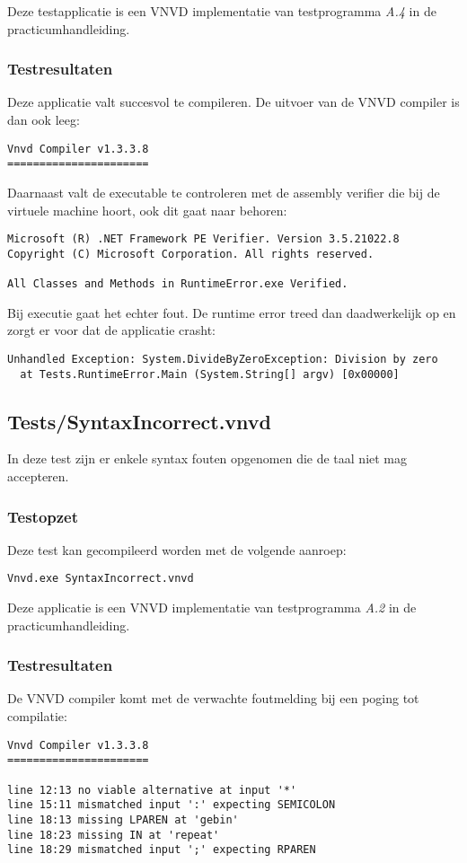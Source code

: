 Deze testapplicatie is een VNVD implementatie van testprogramma \textit{A.4} in de practicumhandleiding.

\subsubsection{Testresultaten}
Deze applicatie valt succesvol te compileren. De uitvoer van de VNVD compiler is dan ook leeg:

\begin{lstlisting}
Vnvd Compiler v1.3.3.8
======================

\end{lstlisting}

Daarnaast valt de executable te controleren met de assembly verifier die bij de virtuele machine hoort, ook dit gaat naar behoren:

\begin{lstlisting}
Microsoft (R) .NET Framework PE Verifier. Version 3.5.21022.8
Copyright (C) Microsoft Corporation. All rights reserved.

All Classes and Methods in RuntimeError.exe Verified.
\end{lstlisting}

Bij executie gaat het echter fout. De runtime error treed dan daadwerkelijk op en zorgt er voor dat de applicatie crasht:

\begin{lstlisting}
Unhandled Exception: System.DivideByZeroException: Division by zero
  at Tests.RuntimeError.Main (System.String[] argv) [0x00000]
\end{lstlisting}

\subsection{Tests/SyntaxIncorrect.vnvd}
In deze test zijn er enkele syntax fouten opgenomen die de taal niet mag accepteren.

\subsubsection{Testopzet}
Deze test kan gecompileerd worden met de volgende aanroep:

\begin{lstlisting}
Vnvd.exe SyntaxIncorrect.vnvd
\end{lstlisting}

Deze applicatie is een VNVD implementatie van testprogramma \textit{A.2} in de practicumhandleiding.

\subsubsection{Testresultaten}
De VNVD compiler komt met de verwachte foutmelding bij een poging tot compilatie:

\begin{lstlisting}
Vnvd Compiler v1.3.3.8
======================

line 12:13 no viable alternative at input '*'
line 15:11 mismatched input ':' expecting SEMICOLON
line 18:13 missing LPAREN at 'gebin'
line 18:23 missing IN at 'repeat'
line 18:29 mismatched input ';' expecting RPAREN
\end{lstlisting}
